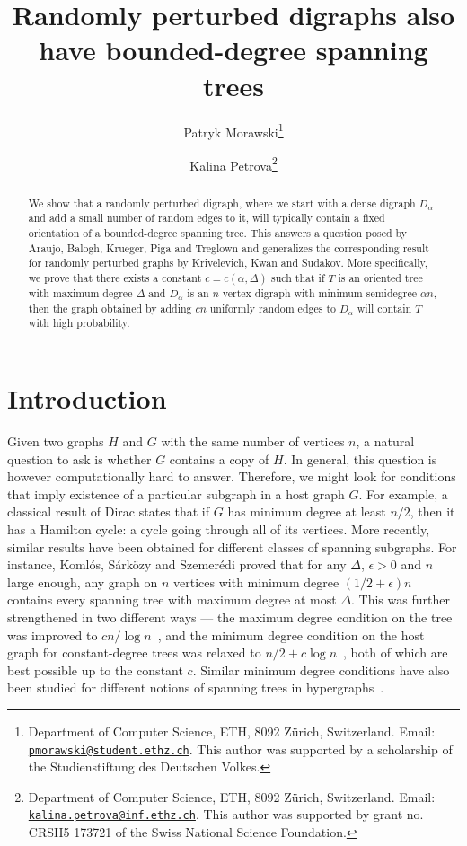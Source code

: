 \documentclass[10pt, a4paper]{article}
\title{Randomly perturbed digraphs also have bounded-degree spanning trees}
\author{
Patryk Morawski\thanks{Department of Computer Science, ETH, 8092 Z\"urich, Switzerland.
			Email: \href{mailto:pmorawski@student.ethz.ch}{\nolinkurl{pmorawski@student.ethz.ch}}. This author was supported by a scholarship of the Studienstiftung des Deutschen Volkes.}
\and Kalina Petrova\thanks{Department of Computer Science, ETH, 8092 Z\"urich, Switzerland.
			Email: \href{mailto:kalina.petrova@inf.ethz.ch}{\nolinkurl{kalina.petrova@inf.ethz.ch}}. This author was supported by grant no. CRSII5 173721 of the Swiss National Science Foundation.}
}
\date{}
\theoremstyle{remark}
\begin{document}
\maketitle
\begin{abstract}
    We show that a randomly perturbed digraph, where we start with a dense digraph $D_\alpha$ and add a small number of random edges to it, will typically contain a fixed orientation of a bounded-degree spanning tree.
    This answers a question posed by Araujo, Balogh, Krueger, Piga and Treglown and generalizes the corresponding result for randomly perturbed graphs by Krivelevich, Kwan and Sudakov.
    More specifically, we prove that there exists a constant $c = c(\alpha, \Delta)$ such that if $T$ is an oriented tree with maximum degree $\Delta$ and $D_\alpha$ is an $n$-vertex digraph  with minimum semidegree $\alpha n$, then the graph obtained by adding $cn$ uniformly random edges to $D_\alpha$ will contain $T$ with high probability.
\end{abstract}

\section[short]{Introduction}
Given two graphs $H$ and $G$ with the same number of vertices $n$, a natural question to ask is whether $G$ contains a copy of $H$.
In general, this question is however computationally hard to answer.
Therefore, we might look for conditions that imply existence of a particular subgraph in a host graph $G$.
For example, a classical result of Dirac \cite{dirac} states that if $G$ has minimum degree at least $n/2$, then it has a Hamilton cycle: a cycle going through all of its vertices.
More recently, similar results have been obtained for different classes of spanning subgraphs.
For instance, Komlós, Sárközy and Szemerédi \cite{komlós_sárközy_szemerédi} proved that for any $\Delta$, $\epsilon > 0$ and $n$ large enough, any graph on $n$ vertices with minimum degree $(1/2 + \epsilon)n$ contains every spanning tree with maximum degree at most $\Delta$. This was further strengthened in two different ways --- the maximum degree condition on the tree was improved to $c n/\log n$~\cite{kss2001}, and the minimum degree condition on the host graph for constant-degree trees was relaxed to $n/2+c\log n$~\cite{csaba2010}, both of which are best possible up to the constant $c$. Similar minimum degree conditions have also been studied for different notions of spanning trees in hypergraphs~\cite{pavez-signe_dirac-type_2021,pehova2023minimum}.
\end{document}
